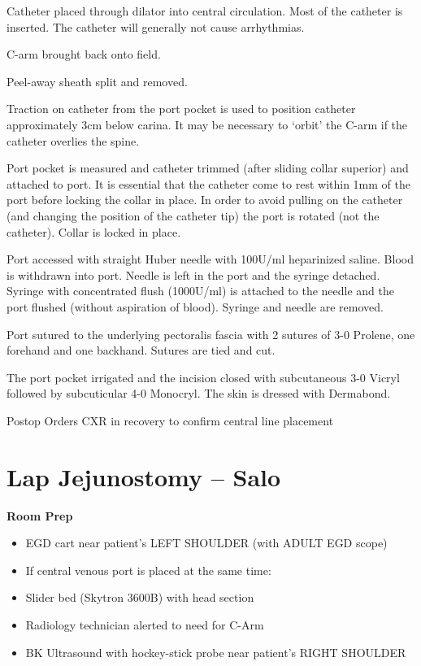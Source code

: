 \documentclass[
]{book}
\providecommand{\tightlist}{%
  \setlength{\itemsep}{0pt}\setlength{\parskip}{0pt}}
\begin{document}
Catheter placed through dilator into central circulation. Most of the catheter is inserted. The catheter will generally not cause arrhythmias.

C-arm brought back onto field.

Peel-away sheath split and removed.

Traction on catheter from the port pocket is used to position catheter approximately 3cm below carina. It may be necessary to `orbit' the C-arm if the catheter overlies the spine.

Port pocket is measured and catheter trimmed (after sliding collar superior) and attached to port. It is essential that the catheter come to rest within 1mm of the port before locking the collar in place. In order to avoid pulling on the catheter (and changing the position of the catheter tip) the port is rotated (not the catheter). Collar is locked in place.

Port accessed with straight Huber needle with 100U/ml heparinized saline. Blood is withdrawn into port. Needle is left in the port and the syringe detached. Syringe with concentrated flush (1000U/ml) is attached to the needle and the port flushed (without aspiration of blood). Syringe and needle are removed.

Port sutured to the underlying pectoralis fascia with 2 sutures of 3-0 Prolene, one forehand and one backhand. Sutures are tied and cut.

The port pocket irrigated and the incision closed with subcutaneous 3-0 Vicryl followed by subcuticular 4-0 Monocryl. The skin is dressed with Dermabond.

Postop Orders
CXR in recovery to confirm central line placement

\hypertarget{lap-jejunostomy-salo}{%
\chapter{Lap Jejunostomy -- Salo}\label{lap-jejunostomy-salo}}

\textbf{Room Prep}

\begin{itemize}
\tightlist
\item
  EGD cart near patient's LEFT SHOULDER (with ADULT EGD scope)
\item
  If central venous port is placed at the same time:
\item
  Slider bed (Skytron 3600B) with head section
\item
  Radiology technician alerted to need for C-Arm
\item
  BK Ultrasound with hockey-stick probe near patient's RIGHT SHOULDER
\end{itemize}
\end{document}
